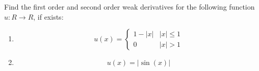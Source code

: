 Find the first order and second order weak derivatives for the following function $u: R \rightarrow R$, if exists:

\begin{enumerate}
\item
  $$
  u(x) =
  \begin{cases}
    1 - |x| & |x| \leq 1\\
    0 & |x| > 1
  \end{cases}
  $$

\item
  $$
  u(x) = |\sin(x)|
  $$

\end{enumerate}
